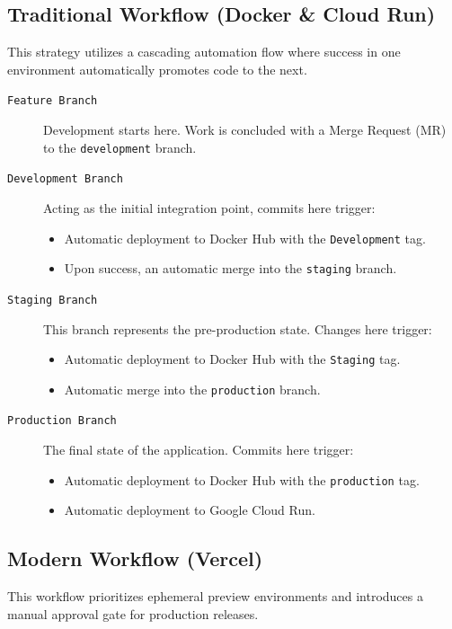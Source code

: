 \documentclass[a4paper,12pt]{report}
\begin{document}
    \subsection{Traditional Workflow (Docker \& Cloud Run)}
    This strategy utilizes a cascading automation flow where success in one environment automatically promotes code to the next.

    \begin{description}
        \item[\texttt{Feature Branch}]
        Development starts here. Work is concluded with a Merge Request (MR) to the \texttt{development} branch.
        
        \item[\texttt{Development Branch}]
        Acting as the initial integration point, commits here trigger:
        \begin{itemize}
            \item Automatic deployment to Docker Hub with the \texttt{Development} tag.
            \item Upon success, an automatic merge into the \texttt{staging} branch.
        \end{itemize}
        
        \item[\texttt{Staging Branch}]
        This branch represents the pre-production state. Changes here trigger:
        \begin{itemize}
            \item Automatic deployment to Docker Hub with the \texttt{Staging} tag.
            \item Automatic merge into the \texttt{production} branch.
        \end{itemize}
        
        \item[\texttt{Production Branch}]
        The final state of the application. Commits here trigger:
        \begin{itemize}
            \item Automatic deployment to Docker Hub with the \texttt{production} tag.
            \item Automatic deployment to Google Cloud Run.
        \end{itemize}
    \end{description}

    \subsection{Modern Workflow (Vercel)}
    This workflow prioritizes ephemeral preview environments and introduces a manual approval gate for production releases.
\end{document}
